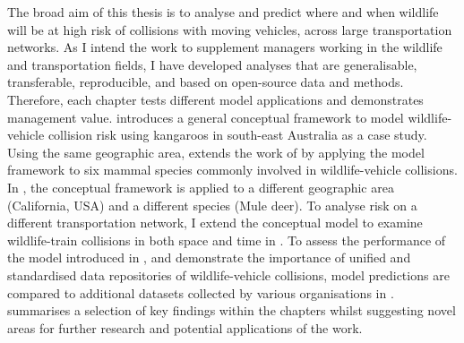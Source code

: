 The broad aim of this thesis is to analyse and predict where and when wildlife will be at high risk of collisions with moving vehicles, across large transportation networks. As I intend the work to supplement managers working in the wildlife and transportation fields, I have developed analyses that are generalisable, transferable, reproducible, and based on open-source data and methods. Therefore, each chapter tests different model applications and demonstrates management value.  introduces a general conceptual framework to model wildlife-vehicle collision risk using kangaroos in south-east Australia as a case study. Using the same geographic area,  extends the work of  by applying the model framework to six mammal species commonly involved in wildlife-vehicle collisions. In , the conceptual framework is applied to a different geographic area (California, USA) and a different species (Mule deer). To analyse risk on a different transportation network, I extend the conceptual model to examine wildlife-train collisions in both space and time in . To assess the performance of the model introduced in , and demonstrate the importance of unified and standardised data repositories of wildlife-vehicle collisions, model predictions are compared to additional datasets collected by various organisations in .  summarises a selection of key findings within the chapters whilst suggesting novel areas for further research and potential applications of the work.